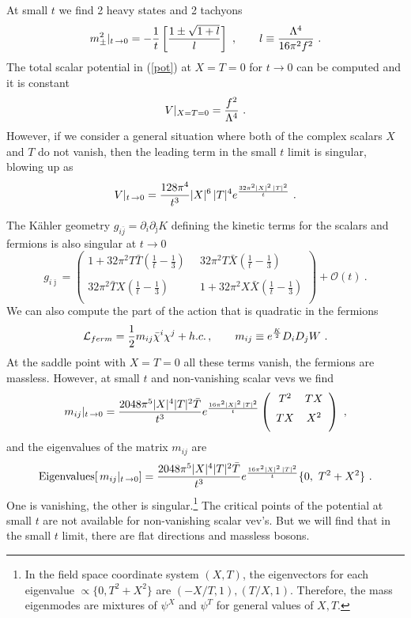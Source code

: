 \documentclass[11pt]{article}
\newcommand{\be}{\begin{equation}}
\newcommand{\ee}{\end{equation}}
\def\K{K{\"a}hler }
\newcommand{\rf}[1]{(\ref{#1})}
\def\be{\begin{equation}}
\def\ee{\end{equation}}
\newcommand{\lp}{\left(}
\newcommand{\rp}{\right)}
\begin{document}
At small $t$ we find 2 heavy states and 2 tachyons
\be
m^2_{\pm} |_{t \,  \rightarrow  0} =  -  {  1\over  t    }  \left[ {1   \pm  \sqrt { 1+l }\over l }   \right ] \ , \qquad l \equiv {   \Lambda ^4\over  16 \pi^2 f^2 } \ .
  \label{tach1lim1}\ee
The total scalar potential in \rf{pot} at $X=T=0$ for $t\to 0$ can be computed and it is constant
\be
V|_{X=T=0}={f^2\over \Lambda^4} \ .
\ee
However, if we consider a general situation  where both of the complex scalars $X$ and $T$ do not vanish, then the leading term in the small $t$ limit is singular, blowing up as
\be
V |_{t \,  \rightarrow  0} =  {128\pi^4 \over  t^3}|X|^6\, |T|^4  e^{32\pi^2  |X|^2\, |T|^2\over t} \ .
\label{small_t}\ee

The \K geometry $g_{i\bar j} =\partial_i\partial_{\bar \jmath} K$ defining the kinetic terms for the  scalars and fermions
is also singular at $t\to 0$
 \be
g_{i\bar \jmath} = \left(
\begin{array}{cc}
1+ 32 \pi ^2  T\bar T\lp \frac1t-\frac13 \rp& \, \, \, 32 \pi ^2 T \bar X \lp \frac1t-\frac13 \rp\\
 \\
 32 \pi ^2 \bar T  X \lp \frac1t-\frac13 \rp& \, \, \, 1+ 32 \pi ^2  X\bar X\lp \frac1t-\frac13 \rp\\
\end{array}
\right) + \mathcal{O}(t)\ .
\ee
We can also compute the part of the action  that is quadratic in the fermions 
\be
{\cal L}_{ferm} = {1\over 2} m_{ij} \bar \chi^i  \chi^j + h. c. \, , 
\qquad m_{ij}\equiv e^{K\over 2} D_{i} D_{j} W \ .
\label{ferm}\ee At the saddle point with $X=T=0$ all these terms vanish, the fermions are massless. However, at small $t$ and non-vanishing scalar vevs we find 
\be
m_{ij}|_{t \,  \rightarrow  0} = {2048 \pi ^5  |X|^4  |T|^2 \bar{T}\over t^3} e^{  16 \pi ^2 |X|^2\, |T|^2 \over  t}
\lp \begin{array}{cc}
   T^2 & T X\vspace{2mm}\\\vspace{2mm}
   TX & X^2
  \end{array}\rp \ ,
\ee
and the eigenvalues of the matrix $m_{ij}$ are  
\be
{\rm Eigenvalues}[  \, m_{ij}|_{t \,  \rightarrow  0} ] = {2048 \pi ^5  |X|^4  |T|^2 \bar{T}\over t^3} e^{  16 \pi ^2 |X|^2\, |T|^2 \over  t}
\label{eig}\{  0, \, \, T^2+X^2\}\ .
\ee
One is vanishing, the other is singular.\footnote{In the field space coordinate system $(X,T)$, the eigenvectors for each eigenvalue $\propto \{0,T^2+X^2\}$ are $(-X/T,1), (T/X,1)$. Therefore, the mass eigenmodes are mixtures of $\psi^X$ and $\psi^T$ for general values of $X,T$.} 
The critical points of the potential at small $t$ are not available for non-vanishing scalar vev's. But we will find  that in the small $t$ limit, there are  flat directions and massless bosons.
\end{document}
